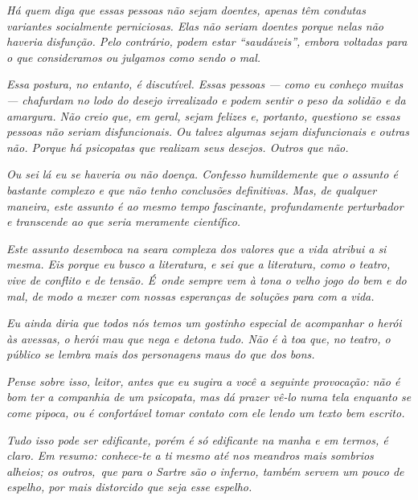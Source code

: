 \emph{Há quem diga que essas pessoas não sejam doentes, apenas têm
condutas variantes socialmente perniciosas. Elas não seriam doentes
porque nelas não haveria disfunção. Pelo contrário, podem estar
``saudáveis'', embora voltadas para o que consideramos ou julgamos como
sendo o mal.}

\emph{Essa postura, no entanto, é discutível. Essas pessoas --- como eu
conheço muitas --- chafurdam no lodo do desejo irrealizado e podem
sentir o peso da solidão e da amargura. Não creio que, em geral, sejam
felizes e, portanto, questiono se essas pessoas não seriam
disfuncionais. Ou talvez algumas sejam disfuncionais e outras não.
Porque há psicopatas que realizam seus desejos. Outros que não.}

\emph{Ou sei lá eu se haveria ou não doença. Confesso humildemente que o
assunto é bastante complexo e que não tenho conclusões definitivas. Mas,
de qualquer maneira, este assunto é ao mesmo tempo fascinante,
profundamente perturbador e transcende ao que seria meramente
científico.}

\emph{Este assunto desemboca na seara complexa dos valores que a vida
atribui a si mesma. Eis porque eu busco a literatura, e sei que a
literatura, como o teatro, vive de conflito e de tensão. É~onde sempre
vem à tona o velho jogo do bem e do mal, de modo a mexer com nossas
esperanças de soluções para com a vida.}

\emph{Eu ainda diria que todos nós temos um gostinho especial de
acompanhar o herói às avessas, o herói mau que nega e detona tudo. Não é
à toa que, no teatro, o público se lembra mais dos personagens maus do
que dos bons.}

\emph{Pense sobre isso, leitor, antes que eu sugira a você a seguinte
provocação: não é bom ter a companhia de um psicopata, mas dá prazer
vê-lo numa tela enquanto se come pipoca, ou é confortável tomar contato
com ele lendo um texto bem escrito.}

\emph{Tudo isso pode ser edificante, porém é só edificante na manha e em
termos, é claro. Em resumo: conhece-te a ti mesmo até nos meandros mais
sombrios alheios; os outros,~que para o Sartre são o inferno, também
servem um pouco de espelho, por mais distorcido que seja esse espelho.~}
\endgroup